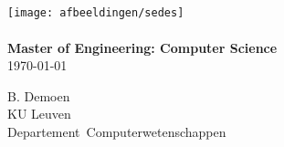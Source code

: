 \documentclass[11pt]{report}
\begin{document}
\renewcommand{\thepage}{}



\begin{center}
~~\\
~~\\
~~\\
~~\\
\texttt{[image: afbeeldingen/sedes]}
~~\\
~~\\
{\Large \bf Master of Engineering: Computer Science}\\[0.5cm] \today

\vspace*{2cm}
{\large B. Demoen}\\
KU Leuven\\
Departement\ Computerwetenschappen 
\end{center}

\newpage


\setcounter{tocdepth}{1}
\tableofcontents
\setcounter{page}{1}
\renewcommand{\thepage}{\roman{page}}

\newpage


\renewcommand{\thepage}{\arabic{page}}
\setcounter{page}{1}
\setlength{\parskip}{0.2cm}




 






% 
\end{document}
